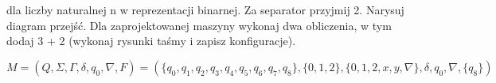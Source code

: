 \documentclass[leqno]{article}
\begin{document}
            dla liczby naturalnej n w reprezentacji binarnej. 
            Za separator przyjmij 2. Narysuj diagram przejść. 
            Dla zaprojektowanej maszyny wykonaj dwa obliczenia,
            w tym dodaj 3 + 2 (wykonaj rysunki taśmy i zapisz konfiguracje).

            \begin{equation}
                M = (Q, \Sigma, \Gamma, \delta, q_0, \nabla, F) = (
                    \{q_0, q_1, q_2, q_3, q_4, q_5, q_6, q_7, q_8\}, 
                    \{0, 1, 2\}, 
                    \{0, 1, 2, x, y, \nabla\}, 
                    \delta, 
                    q_0, 
                    \nabla, 
                    \{q_8\}
                )
            \end{equation}

            \begin{center}
\end{center}
\end{document}
